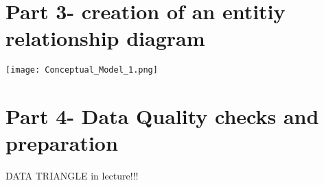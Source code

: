 \documentclass[a4paper]{article}
\begin{document}
\section{Part 3- creation of an entitiy relationship diagram}


\texttt{[image: Conceptual\_Model\_1.png]}


\section{Part 4- Data Quality checks and preparation}
DATA TRIANGLE in lecture!!!
\end{document}
